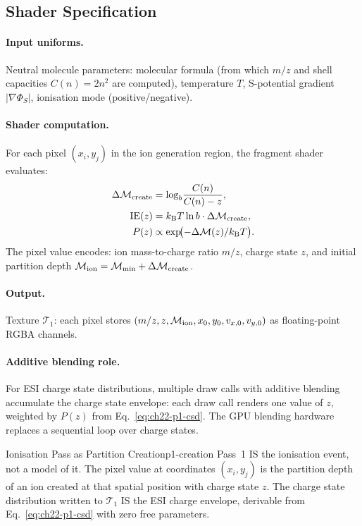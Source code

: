 \subsection{Shader Specification}

\paragraph{Input uniforms.}
Neutral molecule parameters: molecular formula (from which $m/z$ and shell
capacities $C(n) = 2n^2$ are computed), temperature $T$, S-potential gradient
$|\nabla\Phi_S|$, ionisation mode (positive/negative).

\paragraph{Shader computation.}

For each pixel $(x_i, y_j)$ in the ion generation region, the fragment shader
evaluates:
\begin{align}
  \Delta\mathcal{M}_{\mathrm{create}} &= \log_b\!\frac{C(n)}{C(n)-z}, \label{eq:ch22-p1-depth}\\
  \mathrm{IE}(z) &= k_{\mathrm{B}} T\ln b\cdot\Delta\mathcal{M}_{\mathrm{create}}, \label{eq:ch22-p1-ie}\\
  P(z) &\propto \exp\!\bigl(-\Delta\mathcal{M}(z)/k_{\mathrm{B}} T\bigr). \label{eq:ch22-p1-csd}
\end{align}
The pixel value encodes: ion mass-to-charge ratio $m/z$, charge state $z$,
and initial partition depth $\mathcal{M}_{\mathrm{ion}} = \mathcal{M}_{\min} +
\Delta\mathcal{M}_{\mathrm{create}}$.

\paragraph{Output.}
Texture $\mathcal{T}_1$: each pixel stores $(m/z, z, \mathcal{M}_{\mathrm{ion}},
x_0, y_0, v_{x,0}, v_{y,0})$ as floating-point RGBA channels.

\paragraph{Additive blending role.}
For ESI charge state distributions, multiple draw calls with additive blending
accumulate the charge state envelope: each draw call renders one value of $z$,
weighted by $P(z)$ from Eq.~\eqref{eq:ch22-p1-csd}.  The GPU blending hardware
replaces a sequential loop over charge states.

\begin{consequence}{Ionisation Pass as Partition Creation}{p1-creation}
  Pass~1 IS the ionisation event, not a model of it.  The pixel value at
  coordinates $(x_i, y_j)$ is the partition depth of an ion created at that
  spatial position with charge state $z$.  The charge state distribution
  written to $\mathcal{T}_1$ IS the ESI charge envelope, derivable from
  Eq.~\eqref{eq:ch22-p1-csd} with zero free parameters.
\end{consequence}

